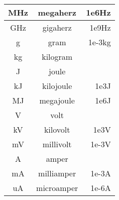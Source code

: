 \begin{longtable}{|c|c|r|}
  MHz & megaherz & 1e6Hz \\\hline
  GHz & gigaherz & 1e9Hz \\\hline
  g & gram & 1e-3kg \\\hline
  kg & kilogram & \\\hline
  J & joule & \\\hline
  kJ & kilojoule & 1e3J \\\hline
  MJ & megajoule & 1e6J \\\hline
  V & volt & \\\hline
  kV & kilovolt & 1e3V \\\hline
  mV & millivolt & 1e-3V \\\hline
  A & amper & \\\hline
  mA & milliamper & 1e-3A \\\hline
  uA & microamper & 1e-6A \\\hline
\end{longtable}






